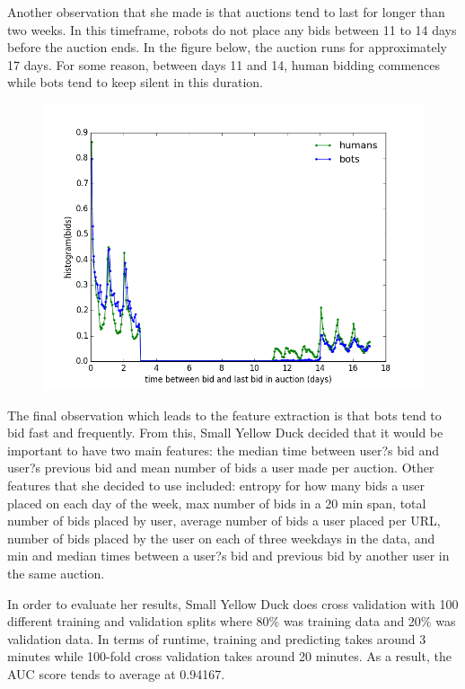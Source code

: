 \documentclass{article} %
\begin{document}
Another observation that she made is that auctions tend to last for longer than two weeks.
In this timeframe, robots do not place any bids between 11 to 14 days before the auction ends.
In the figure below, the auction runs for approximately 17 days.
For some reason, between days 11 and 14, human bidding commences while bots tend to keep silent in this duration.

\begin{figure}[h]
\centering
{\includegraphics[scale=0.26]{img/yellowduck2.png}}
\end{figure}

The final observation which leads to the feature extraction is that bots tend to bid fast and frequently.
From this, Small Yellow Duck decided that it would be important to have two main features: the median time between user?s bid and user?s previous bid and mean number of bids a user made per auction.
Other features that she decided to use included: entropy for how many bids a user placed on each day of the week, max number of bids in a 20 min span, total number of bids placed by user, average number of bids a user placed per URL, number of bids placed by the user on each of three weekdays in the data, and min and median times between a user?s bid and previous bid by another user in the same auction.

In order to evaluate her results, Small Yellow Duck does cross validation with 100 different training and validation splits where 80\% was training data and 20\% was validation data.
In terms of runtime, training and predicting takes around 3 minutes while 100-fold cross validation takes around 20 minutes.
As a result, the AUC score tends to average at 0.94167.
\end{document}
